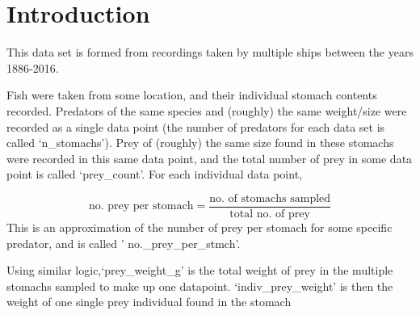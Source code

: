 \documentclass[
]{article}
\newenvironment{Shaded}{\begin{snugshade}}{\end{snugshade}}
\newcommand{\CommentTok}[1]{\textcolor[rgb]{0.56,0.35,0.01}{\textit{#1}}}
\newcommand{\FunctionTok}[1]{\textcolor[rgb]{0.00,0.00,0.00}{#1}}
\newcommand{\NormalTok}[1]{#1}
\newcommand{\OtherTok}[1]{\textcolor[rgb]{0.56,0.35,0.01}{#1}}
\newcommand{\SpecialCharTok}[1]{\textcolor[rgb]{0.00,0.00,0.00}{#1}}
\begin{document}
\begin{Shaded}
\end{Shaded}

\hypertarget{introduction}{%
\section{Introduction}\label{introduction}}

This data set is formed from recordings taken by multiple ships between
the years 1886-2016.

Fish were taken from some location, and their individual stomach
contents recorded. Predators of the same species and (roughly) the same
weight/size were recorded as a single data point (the number of
predators for each data set is called `n\_stomachs'). Prey of (roughly)
the same size found in these stomachs were recorded in this same data
point, and the total number of prey in some data point is called
`prey\_count'. For each individual data point,

\[
    \text{no. prey per stomach} = \frac{\text{no. of stomachs sampled}}{\text{total no. of prey}}
\] This is an approximation of the number of prey per stomach for some
specific predator, and is called ' no.\_prey\_per\_stmch'.

Using similar logic,`prey\_weight\_g' is the total weight of prey in the
multiple stomachs sampled to make up one datapoint.
`indiv\_prey\_weight' is then the weight of one single prey individual
found in the stomach
\end{document}
